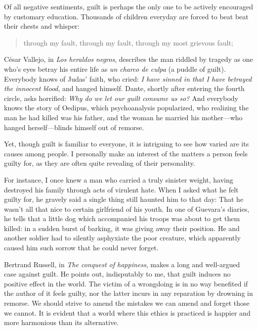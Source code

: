 \documentclass[a4paper, 12pt]{article}
\begin{document}
Of all negative sentiments, guilt is perhaps the only one to be actively
encouraged by customary education. Thousands of children everyday are forced to
beat beat their chests and whisper:

\begin{quote}
    through my fault, through my fault, \linebreak
    through my most grievous fault;
\end{quote}

César Vallejo, in \textit{Los heraldos negros}, describes the man riddled by
tragedy as one who's eyes betray his entire life as \textit{un charco de culpa}
(a puddle of guilt). Everybody knows of Judas' faith, who cried: \textit{I have
sinned in that I have betrayed the innocent blood}, and hanged himself. Dante,
shortly after entering the fourth circle, asks horrified: \textit{Why do we let
our guilt consume us so?} And everybody knows the story of Oedipus, which
psychoanalysis popularized, who realizing the man he had killed was his father,
and the woman he married his mother—who hanged herself—blinds himself out
of remorse.

Yet, though guilt is familiar to everyone, it is
intriguing to see how varied are its causes among people. I personally make an
interest of the matters a person feels guilty for, as they are often quite
revealing of their personality.

For instance, I once knew a man who carried a truly sinister weight, having
destroyed his family through acts of virulent hate. When I asked what he felt
guilty for, he gravely said a single thing still haunted him to that day: That
he wasn't all that nice to certain girlfriend of his youth. In one of Guevara's
diaries, he tells that a little dog which accompanied his troops was about to
get them killed: in a sudden burst of barking, it was giving away their
position. He and another soldier had to silently asphyxiate the poor creature,
which apparently caused him such sorrow that he could never forget. 

Bertrand Russell, in \textit{The conquest of happiness}, makes a long and
well-argued case against guilt. He points out, indisputably to me, that guilt
induces no positive effect in the world. The victim of a wrongdoing is in no
way benefited if the author of it feels guilty, nor the latter incurs in any
reparation by drowning in remorse. We should strive to amend the mistakes we
can amend and forget those we cannot. It is evident that a world where this
ethics is practiced is happier and more harmonious than its alternative.
\end{document}
